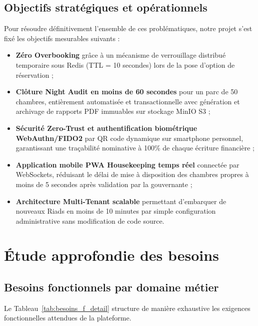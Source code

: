 \documentclass[12pt,a4paper,oneside]{report}
\begin{document}
\subsection{Objectifs stratégiques et opérationnels}

Pour résoudre définitivement l'ensemble de ces problématiques, notre projet s'est fixé les objectifs mesurables suivants :

\begin{itemize}
    \item \textbf{Zéro Overbooking} grâce à un mécanisme de verrouillage distribué temporaire sous Redis (TTL = 10 secondes) lors de la pose d'option de réservation ;
    \item \textbf{Clôture Night Audit en moins de 60 secondes} pour un parc de 50 chambres, entièrement automatisée et transactionnelle avec génération et archivage de rapports PDF immuables sur stockage MinIO S3 ;
    \item \textbf{Sécurité Zero-Trust et authentification biométrique WebAuthn/FIDO2} par QR code dynamique sur smartphone personnel, garantissant une traçabilité nominative à 100\% de chaque écriture financière ;
    \item \textbf{Application mobile PWA Housekeeping temps réel} connectée par WebSockets, réduisant le délai de mise à disposition des chambres propres à moins de 5 secondes après validation par la gouvernante ;
    \item \textbf{Architecture Multi-Tenant scalable} permettant d'embarquer de nouveaux Riads en moins de 10 minutes par simple configuration administrative sans modification de code source.
\end{itemize}

\section{Étude approfondie des besoins}

\subsection{Besoins fonctionnels par domaine métier}

Le Tableau~\ref{tab:besoins_f_detail} structure de manière exhaustive les exigences fonctionnelles attendues de la plateforme.
\end{document}
